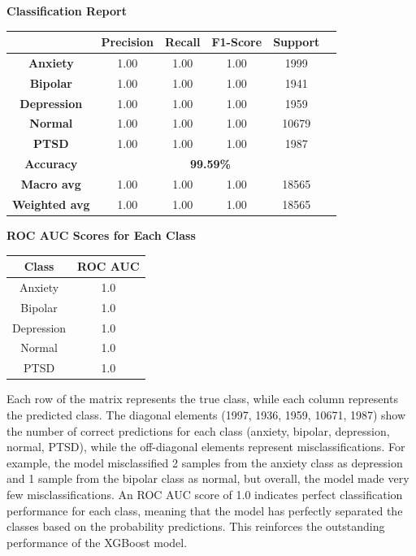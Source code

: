 \begin{center}
    \textbf{Classification Report} \\[0.5em]
    \begin{tabular}{|c|c|c|c|c|c|}
        \hline
        & \textbf{Precision} & \textbf{Recall} & \textbf{F1-Score} & \textbf{Support} \\ \hline
        \textbf{Anxiety}    & 1.00 & 1.00 & 1.00 & 1999 \\ \hline
        \textbf{Bipolar}    & 1.00 & 1.00 & 1.00 & 1941 \\ \hline
        \textbf{Depression} & 1.00 & 1.00 & 1.00 & 1959 \\ \hline
        \textbf{Normal}     & 1.00 & 1.00 & 1.00 & 10679 \\ \hline
        \textbf{PTSD}       & 1.00 & 1.00 & 1.00 & 1987 \\ \hline
        \textbf{Accuracy}   & \multicolumn{4}{c|}{\textbf{99.59\%}} \\ \hline
        \textbf{Macro avg}  & 1.00 & 1.00 & 1.00 & 18565 \\ \hline
        \textbf{Weighted avg} & 1.00 & 1.00 & 1.00 & 18565 \\ \hline
    \end{tabular}
\end{center}

\pagebreak
\begin{center}
    \textbf{ROC AUC Scores for Each Class} \\[0.5em]
    \begin{tabular}{|c|c|}
        \hline
        \textbf{Class} & \textbf{ROC AUC} \\ \hline
        Anxiety  & 1.0 \\ \hline
        Bipolar  & 1.0 \\ \hline
        Depression & 1.0 \\ \hline
        Normal   & 1.0 \\ \hline
        PTSD     & 1.0 \\ \hline
    \end{tabular}
\end{center}

\noindent
Each row of the matrix represents the true class, while each column represents the predicted class. The diagonal elements (1997, 1936, 1959, 10671, 1987) show the number of correct predictions for each class (anxiety, bipolar, depression, normal, PTSD), while the off-diagonal elements represent misclassifications. For example, the model misclassified 2 samples from the anxiety class as depression and 1 sample from the bipolar class as normal, but overall, the model made very few misclassifications. An ROC AUC score of 1.0 indicates perfect classification performance for each class, meaning that the model has perfectly separated the classes based on the probability predictions. This reinforces the outstanding performance of the XGBoost model.


